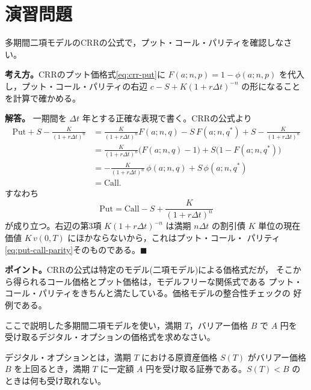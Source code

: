 \section{演習問題}

\begin{exercise}[問題11-1]
多期間二項モデルのCRRの公式で，プット・コール・パリティを確認しなさい。
\end{exercise}

\begin{answerbox}
\textbf{考え方。}CRRのプット価格式\eqref{eq:crr-put}に
$F(a;n,p) = 1-\phi(a;n,p)$ を代入し，プット・コール・パリティの右辺
$c - S + K(1+r\Delta t)^{-n}$ の形になることを計算で確かめる。

\medskip
\textbf{解答。}
一期間を $\Delta t$ 年とする正確な表現で書く。CRRの公式より
\begin{align*}
\mathrm{Put} + S - \frac{K}{(1+r\Delta t)^n}
&= \frac{K}{(1+r\Delta t)^n}F(a;n,q) - S\,F(a;n,q^*)
+ S - \frac{K}{(1+r\Delta t)^n}\\
&= \frac{K}{(1+r\Delta t)^n}\bigl(F(a;n,q) - 1\bigr)
+ S\bigl(1 - F(a;n,q^*)\bigr)\\
&= -\frac{K}{(1+r\Delta t)^n}\,\phi(a;n,q) + S\,\phi(a;n,q^*)\\
&= \mathrm{Call}.
\end{align*}
すなわち
\[
\mathrm{Put} = \mathrm{Call} - S + \frac{K}{(1+r\Delta t)^n}
\]
が成り立つ。右辺の第3項 $K(1+r\Delta t)^{-n}$ は満期 $n\Delta t$ の割引債
$K$ 単位の現在価値 $K\,v(0,T)$ にほかならないから，これはプット・コール・
パリティ\eqref{eq:put-call-parity}そのものである。$\blacksquare$

\medskip
\textbf{ポイント。}CRRの公式は特定のモデル(二項モデル)による価格式だが，
そこから得られるコール価格とプット価格は，モデルフリーな関係式である
プット・コール・パリティをきちんと満たしている。価格モデルの整合性チェックの
好例である。
\end{answerbox}

\begin{exercise}[問題11-2]
ここで説明した多期間二項モデルを使い，満期 $T$，バリアー価格 $B$ で $A$ 円を
受け取るデジタル・オプションの価格式を求めなさい。

デジタル・オプションとは，満期 $T$ における原資産価格 $S(T)$ がバリアー価格
$B$ を上回るとき，満期 $T$ に一定額 $A$ 円を受け取る証券である。$S(T)<B$ の
ときは何も受け取れない。
\end{exercise}

